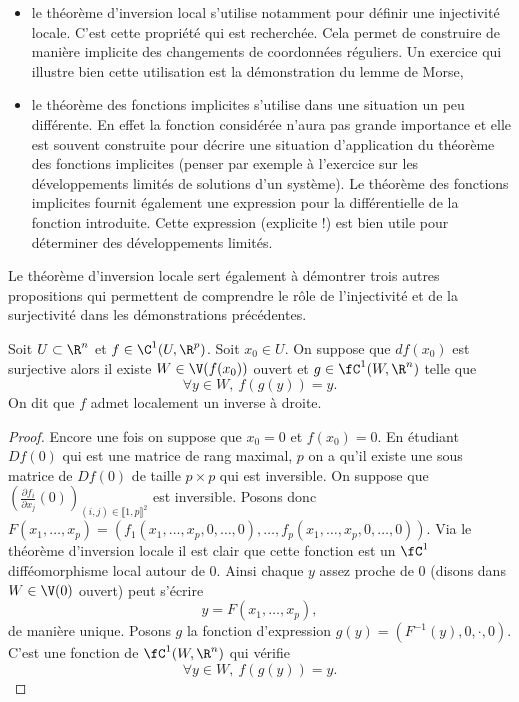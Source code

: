 \documentclass[10pt,a4paper]{article}
\begin{document}
    \begin{itemize}
    \item le théorème d'inversion local s'utilise notamment pour définir une injectivité locale. C'est cette propriété qui est recherchée. Cela permet de construire de manière implicite des changements de coordonnées réguliers. Un exercice qui illustre bien cette utilisation est la démonstration du lemme de Morse,
    \item le théorème des fonctions implicites s'utilise dans une situation un peu différente. En effet la fonction considérée n'aura pas grande importance et elle est souvent construite pour décrire une situation d'application du théorème des fonctions implicites (penser par exemple à l'exercice sur les développements limités de solutions d'un système). Le théorème des fonctions implicites fournit également une expression pour la différentielle de la fonction introduite. Cette expression (explicite !) est bien utile pour déterminer des développements limités.
    \end{itemize}
    Le théorème d'inversion locale sert également à démontrer trois autres propositions qui permettent de comprendre le rôle de l'injectivité et de la surjectivité dans les démonstrations précédentes.
    \begin{prop}
      Soit $U \subset \R^n$ et $f \in \C^1(U,\R^p)$. Soit $x_0 \in U$. On suppose que $df(x_0)$ est surjective alors il existe $W \in \V(f(x_0))$ ouvert et $g \in \fC^1(W,\R^n)$ telle que 
      \[ \forall y \in W, \ f(g(y)) = y.\]
      On dit que $f$ admet localement un inverse à droite.
    \end{prop}
    \begin{proof}
      Encore une fois on suppose que $x_0=0$ et  $f(x_0) = 0$. En étudiant $Df(0)$ qui est une matrice de rang maximal, $p$ on a qu'il existe une sous matrice de $Df(0)$ de taille $p \times p$ qui est inversible. On suppose que $(\frac{\partial f_i}{\partial x_j}(0))_{(i,j) \in \llbracket 1,p \rrbracket^2}$ est inversible. Posons donc $F(x_1, \dots,x_p) = (f_1(x_1,\dots,x_p,0,\dots,0),\dots,f_p(x_1,\dots,x_p,0,\dots,0))$. Via le théorème d'inversion locale il est clair que cette fonction est un $\fC^1$ difféomorphisme local autour de $0$. Ainsi chaque $y$ assez proche de $0$ (disons dans $W \in \V(0)$ ouvert) peut s'écrire
      \[y = F(x_1,\dots,x_p),\] de manière unique.
      Posons $g$ la fonction d'expression $g(y) = (F^{-1}(y), 0, \cdot, 0)$. C'est une fonction de $\fC^1(W,\R^n)$ qui vérifie
      \[\forall y \in W, \ f(g(y)) = y.\]
    \end{proof}
\end{document}
